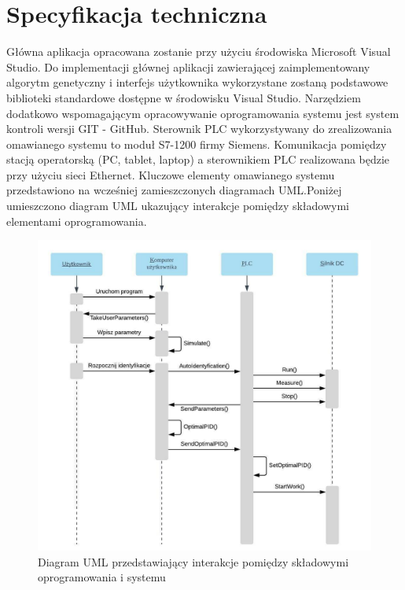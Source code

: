 \section{Specyfikacja techniczna}
\indent Główna aplikacja opracowana zostanie przy użyciu środowiska Microsoft Visual Studio. Do implementacji głównej aplikacji zawierającej zaimplementowany algorytm genetyczny i interfejs użytkownika wykorzystane zostaną podstawowe biblioteki standardowe dostępne w środowisku Visual Studio. \newline
\indent Narzędziem dodatkowo wspomagającym opracowywanie oprogramowania systemu jest system kontroli wersji GIT - GitHub. \newline
\indent Sterownik PLC wykorzystywany do zrealizowania omawianego systemu to moduł S7-1200 firmy Siemens. Komunikacja pomiędzy stacją operatorską (PC, tablet, laptop) a sterownikiem PLC realizowana będzie przy użyciu sieci Ethernet.\newline
\indent Kluczowe elementy omawianego systemu przedstawiono na wcześniej zamieszczonych diagramach UML.Poniżej umieszczono diagram UML ukazujący interakcje pomiędzy składowymi elementami oprogramowania.
\begin{figure}[ht!]
\centering
\includegraphics[scale=0.42]{uml}
\caption{Diagram UML przedstawiający interakcje pomiędzy składowymi oprogramowania i systemu}
\label{komponent2}
\end{figure} 
\newpage
